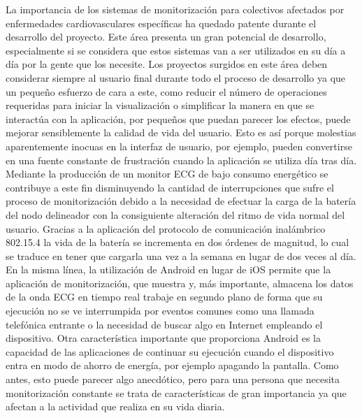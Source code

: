 	La importancia de los sistemas de monitorización para colectivos afectados por enfermedades cardiovasculares específicas ha quedado patente durante el desarrollo del proyecto. Este área presenta un gran potencial de desarrollo, especialmente si se considera que estos sistemas van a ser utilizados en su día a día por la gente que los necesite. Los proyectos surgidos en este área deben considerar siempre al usuario final durante todo el proceso de desarrollo ya que un pequeño esfuerzo de cara a este, como reducir el número de operaciones requeridas para iniciar la visualización o simplificar la manera en que se interactúa con la aplicación, por pequeños que puedan parecer los efectos, puede mejorar sensiblemente la calidad de vida del usuario. Esto es así porque molestias aparentemente inocuas en la interfaz de usuario, por ejemplo, pueden convertirse en una fuente constante de frustración cuando la aplicación se utiliza día tras día.\\

	Mediante la producción de un monitor ECG de bajo consumo energético se contribuye a este fin disminuyendo la cantidad de interrupciones que sufre el proceso de monitorización debido a la necesidad de efectuar la carga de la batería del nodo delineador con la consiguiente alteración del ritmo de vida normal del usuario. Gracias a la aplicación del protocolo de comunicación inalámbrico 802.15.4 la vida de la batería se incrementa en dos órdenes de magnitud, lo cual se traduce en tener que cargarla una vez a la semana en lugar de dos veces al día.\\

	En la misma línea, la utilización de Android en lugar de iOS permite que la aplicación de monitorización, que muestra y, más importante, almacena los datos de la onda ECG en tiempo real trabaje en segundo plano de forma que su ejecución no se ve interrumpida por eventos comunes como una llamada telefónica entrante o la necesidad de buscar algo en Internet empleando el dispositivo. Otra característica importante que proporciona Android es la capacidad de las aplicaciones de continuar su ejecución cuando el dispositivo entra en modo de ahorro de energía, por ejemplo apagando la pantalla. Como antes, esto puede parecer algo anecdótico, pero para una persona que necesita monitorización constante se trata de características de gran importancia ya que afectan a la actividad que realiza en su vida diaria.\\

